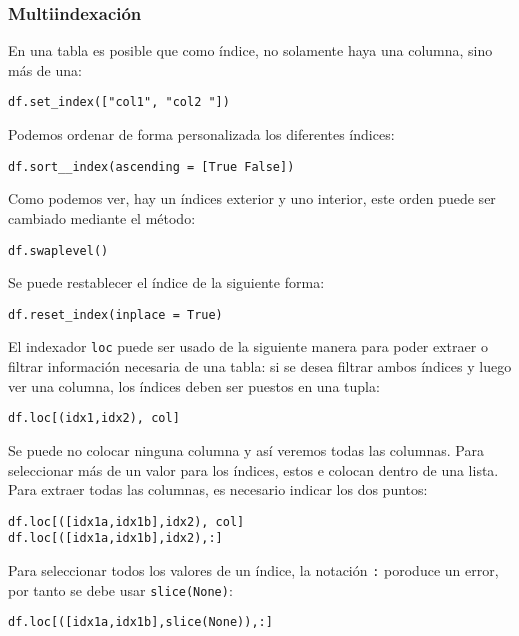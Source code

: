 \subsubsection{Multiindexación}
En una tabla es posible que como índice, no solamente haya una columna, sino más de una:
\begin{verbatim}
df.set_index(["col1", "col2 "])
\end{verbatim}
Podemos ordenar de forma personalizada los diferentes índices:
\begin{verbatim}
df.sort__index(ascending = [True False])
\end{verbatim}
Como podemos ver, hay un índices exterior y uno interior, este orden puede ser cambiado mediante el método:
\begin{verbatim}
df.swaplevel()
\end{verbatim}
Se puede restablecer el índice de la siguiente forma:
\begin{verbatim}
df.reset_index(inplace = True)
\end{verbatim}
El indexador \texttt{loc} puede ser usado de la siguiente manera para poder extraer o filtrar información necesaria de una tabla:
si se desea filtrar ambos índices y luego ver una columna, los índices deben ser puestos en una tupla:
\begin{verbatim}
df.loc[(idx1,idx2), col]
\end{verbatim}
Se puede no colocar ninguna columna y así veremos todas las columnas.
Para seleccionar más de un valor para los índices, estos e colocan dentro de una lista. Para extraer todas las columnas, es necesario indicar los dos puntos:
\begin{verbatim}
df.loc[([idx1a,idx1b],idx2), col]
df.loc[([idx1a,idx1b],idx2),:]
\end{verbatim}
Para seleccionar todos los valores de un índice, la notación \texttt{:} poroduce un error, por tanto se debe usar \texttt{slice(None)}:
\begin{verbatim}
df.loc[([idx1a,idx1b],slice(None)),:]
\end{verbatim}
